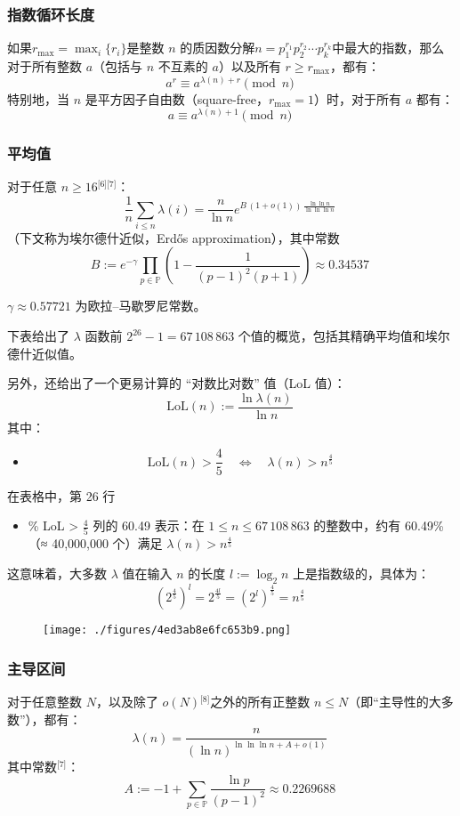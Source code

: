 \subsubsection{指数循环长度}
如果$r_{\mathrm{max}} = \max_{i} \{ r_{i} \}$是整数 $n$ 的质因数分解$n = p_{1}^{r_{1}} p_{2}^{r_{2}} \cdots p_{k}^{r_{k}}$中最大的指数，那么对于所有整数 $a$（包括与 $n$ 不互素的 $a$）以及所有 $r \ge r_{\mathrm{max}}$，都有：
$$
a^{r} \equiv a^{\lambda(n) + r} \pmod{n}~
$$
特别地，当 $n$ 是平方因子自由数（square-free，$r_{\mathrm{max}} = 1$）时，对于所有 $a$ 都有：
$$
a \equiv a^{\lambda(n) + 1} \pmod{n}~
$$
\subsubsection{平均值}
对于任意 $n \ge 16$\(^\text{[6][7]}\)：
$$
\frac{1}{n} \sum_{i \le n} \lambda(i) = \frac{n}{\ln n} e^{B \,(1 + o(1)) \,\frac{\ln \ln n}{\ln \ln \ln n}}~
$$
（下文称为埃尔德什近似，Erdős approximation），其中常数
$$
B := e^{-\gamma} \prod_{p \in \mathbb{P}} \left( 1 - \frac{1}{(p - 1)^{2}(p + 1)} \right) \approx 0.34537~
$$

$\gamma \approx 0.57721$ 为欧拉–马歇罗尼常数。

下表给出了 $\lambda$ 函数前 $2^{26} - 1 = 67\,108\,863$ 个值的概览，包括其精确平均值和埃尔德什近似值。

另外，还给出了一个更易计算的 “对数比对数” 值（LoL 值）：
$$
\mathrm{LoL}(n) := \frac{\ln \lambda(n)}{\ln n}~
$$
其中：
\begin{itemize}
\item 
$$
\mathrm{LoL}(n) > \frac{4}{5} \quad \Leftrightarrow \quad \lambda(n) > n^{\frac{4}{5}}~
$$
\end{itemize}
在表格中，第 26 行 
\begin{itemize}
\item \% LoL > $\frac{4}{5}$ 列的 60.49 表示：在 $1 \le n \le 67\,108\,863$ 的整数中，约有 60.49\%（≈ 40,000,000 个）满足 $\lambda(n) > n^{\frac{4}{5}}$
\end{itemize}
这意味着，大多数 $\lambda$ 值在输入 $n$ 的长度 $l := \log_{2} n$ 上是指数级的，具体为：
$$
\left( 2^{\frac{4}{5}} \right)^{l} = 2^{\frac{4l}{5}} = \left( 2^{l} \right)^{\frac{4}{5}} = n^{\frac{4}{5}}~
$$
\begin{figure}[ht]
\centering
\texttt{[image: ./figures/4ed3ab8e6fc653b9.png]}
\caption{} \label{fig_KMKRhs_3}
\end{figure}
\subsubsection{主导区间}
对于任意整数 $N$，以及除了 $o(N)$\(^\text{[8]}\)之外的所有正整数 $n \le N$（即“主导性的大多数”），都有：
$$
\lambda(n) = \frac{n}{(\ln n)^{\ln \ln \ln n + A + o(1)}}~
$$
其中常数\(^\text{[7]}\)：
$$
A := -1 + \sum_{p \in \mathbb{P}} \frac{\ln p}{(p - 1)^{2}} \approx 0.2269688~
$$

